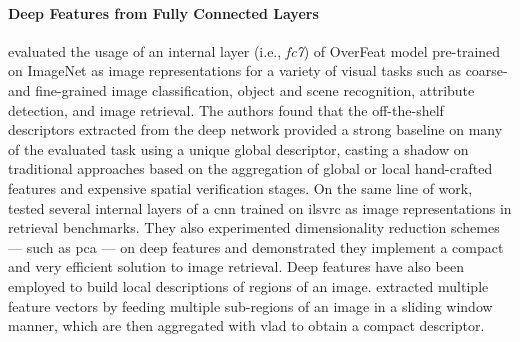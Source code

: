 \paragraph{Deep Features from Fully Connected Layers}
\citet{sharif2014cnn} evaluated the usage of an internal layer (i.e., \emph{fc7}) of OverFeat model pre-trained on ImageNet as image representations for a variety of visual tasks such as coarse- and fine-grained image classification, object and scene recognition, attribute detection, and image retrieval.
The authors found that the off-the-shelf descriptors extracted from the deep network provided a strong baseline on many of the evaluated task using a unique global descriptor, casting a shadow on traditional approaches based on the aggregation of global or local hand-crafted features and expensive spatial verification stages.
%
On the same line of work, \citet{babenko2014neural} tested several internal layers of a \gls{cnn} trained on \gls{ilsvrc} as image representations in retrieval benchmarks.
They also experimented dimensionality reduction schemes --- such as \gls{pca} --- on deep features and demonstrated they implement a compact and very efficient solution to image retrieval.
%
Deep features have also been employed to build local descriptions of regions of an image.
\citet{gong2014multi} extracted multiple feature vectors by feeding multiple sub-regions of an image in a sliding window manner,  which are then aggregated with \gls{vlad} to obtain a compact descriptor.

